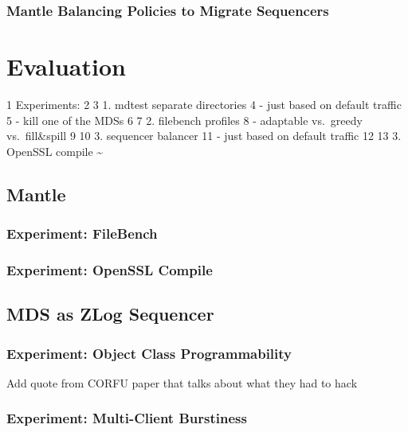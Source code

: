 \documentclass[10pt,twocolumn]{article}
\begin{document}
\subsubsection{Mantle Balancing Policies to Migrate
Sequencers}\label{mantle-balancing-policies-to-migrate-sequencers}

\section{Evaluation}\label{evaluation}

1 Experiments: 2 3 1. mdtest separate directories 4 - just based on
default traffic 5 - kill one of the MDSs 6 7 2. filebench profiles 8 -
adaptable vs.~greedy vs.~fill\&spill 9 10 3. sequencer balancer 11 -
just based on default traffic 12 13 3. OpenSSL compile
\textasciitilde{}\\\label{evaluation}

\subsection{Mantle}\label{mantle}

\subsubsection{Experiment: FileBench}\label{experiment-filebench}

\subsubsection{Experiment: OpenSSL
Compile}\label{experiment-openssl-compile}

\subsection{MDS as ZLog Sequencer}\label{mds-as-zlog-sequencer}

\subsubsection{Experiment: Object Class
Programmability}\label{experiment-object-class-programmability}

Add quote from CORFU paper that talks about what they had to hack

\subsubsection{Experiment: Multi-Client
Burstiness}\label{experiment-multi-client-burstiness}
\end{document}
